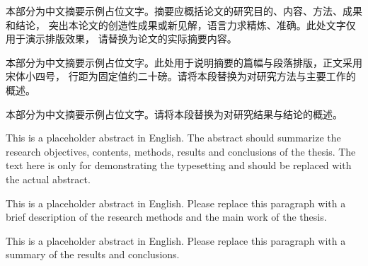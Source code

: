 
\begin{cabstract}
本部分为中文摘要示例占位文字。摘要应概括论文的研究目的、内容、方法、成果和结论，
突出本论文的创造性成果或新见解，语言力求精炼、准确。此处文字仅用于演示排版效果，
请替换为论文的实际摘要内容。

本部分为中文摘要示例占位文字。此处用于说明摘要的篇幅与段落排版，正文采用宋体小四号，
行距为固定值约二十磅。请将本段替换为对研究方法与主要工作的概述。

本部分为中文摘要示例占位文字。请将本段替换为对研究结果与结论的概述。

\end{cabstract}

\begin{eabstract}
This is a placeholder abstract in English. The abstract should summarize the research
objectives, contents, methods, results and conclusions of the thesis. The text here is
only for demonstrating the typesetting and should be replaced with the actual abstract.

This is a placeholder abstract in English. Please replace this paragraph with a brief
description of the research methods and the main work of the thesis.

This is a placeholder abstract in English. Please replace this paragraph with a summary
of the results and conclusions.

\end{eabstract}
